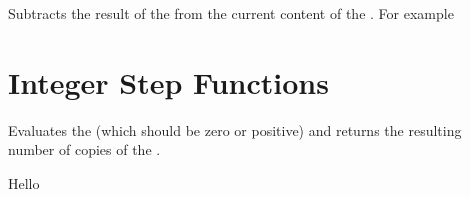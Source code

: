 \documentclass[oneside]{book}
\begin{document}
\begin{function}{\intSub}
\begin{syntax}
  
\end{syntax}
Subtracts the result of the  from the
current content of the . For example
\begin{demohigh}
\intSet {}
\intSub {}
\intUse \lTmpaInt
\end{demohigh}
\end{function}

\section{Integer Step Functions}

\begin{function}{\intReplicate}
\begin{syntax}
  
\end{syntax}
Evaluates the  (which should be zero or positive)
and returns the resulting number of copies of the .
\begin{demohigh}
 {Hello}
\end{demohigh}
\end{function}

\end{document}
